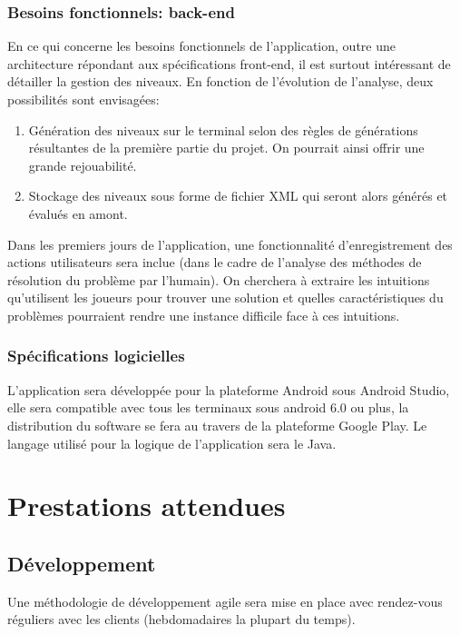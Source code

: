 \documentclass[a4paper, 11pt, titlepage, oneside]{report}
\begin{document}
	\subsection{Besoins fonctionnels: back-end}
	
	En ce qui concerne les besoins fonctionnels de l’application, outre une architecture répondant aux spécifications front-end, il est surtout intéressant de détailler la gestion des niveaux. En fonction de l’évolution de l’analyse, deux possibilités sont envisagées:
	\begin{enumerate}
		\item Génération des niveaux sur le terminal selon des règles de générations résultantes de la première partie du projet. On pourrait ainsi offrir une grande rejouabilité.
		\item Stockage des niveaux sous forme de fichier XML qui seront alors générés et évalués en amont.
	\end{enumerate}

	Dans les premiers jours de l'application, une fonctionnalité d'enregistrement des actions utilisateurs sera inclue (dans le cadre de l'analyse des méthodes de résolution du problème par l'humain). On cherchera à extraire les intuitions qu'utilisent les joueurs pour trouver une solution et quelles caractéristiques du problèmes pourraient rendre une instance difficile face à ces intuitions.

	\subsection{Spécifications logicielles}
	
	L’application sera développée pour la plateforme Android sous Android Studio, elle sera compatible avec tous les terminaux sous android 6.0 ou plus, la distribution du software se fera au travers de la plateforme Google Play. Le langage utilisé pour la logique de l’application sera le Java.

	\chapter{Prestations attendues}
	\section{Développement}
	
	
	Une méthodologie de développement agile sera mise en place avec rendez-vous réguliers avec les clients (hebdomadaires la plupart du temps). 
\end{document}

